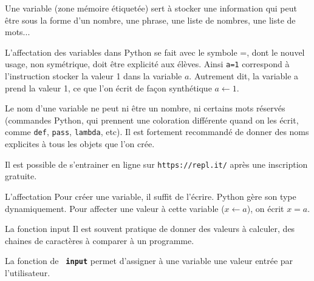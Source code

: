  

\begin{titre}

\end{titre}




Une variable (zone mémoire étiquetée) sert à stocker une information qui peut être sous la forme d’un nombre, une phrase,
une liste de nombres, une liste de mots...

L'affectation des variables dans Python se fait avec le symbole =, dont le nouvel usage, non symétrique, doit être explicité
aux élèves. Ainsi \texttt{a=1} correspond à l'instruction stocker la valeur 1 dans la variable $a$. Autrement dit, la variable
a prend la valeur 1, ce que l'on écrit de façon synthétique $a \longleftarrow 1$.

Le nom d'une variable ne peut ni être un nombre, ni certains mots réservés (commandes Python, qui prennent une coloration
différente quand on les écrit, comme \texttt{def}, \texttt{pass}, \texttt{lambda}, etc). Il est fortement recommandé de donner des noms explicites à tous les objets que l'on crée.

Il est possible de s'entrainer en ligne sur \texttt{https://repl.it/} après une inscription gratuite.
 
\begin{DefT}{L'affectation}
Pour créer une variable, il suffit de l'écrire. Python gère son type dynamiquement. Pour affecter une valeur à cette variable ($x \longleftarrow a$), on écrit $x=a$. 
\end{DefT} 
 
 
\begin{DefT}{La fonction input}
Il est souvent pratique de donner des valeurs  à calculer, des chaines de caractères à comparer à un programme.

La fonction de  \texttt{ \textbf{input}} permet d'assigner  à une variable une valeur entrée par l'utilisateur.
\end{DefT}
 

